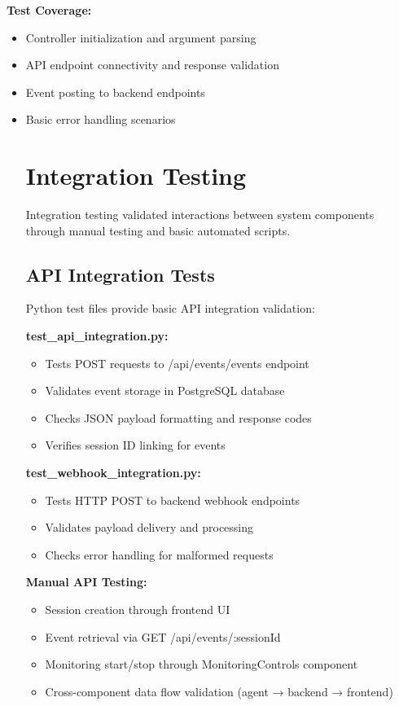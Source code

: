 \textbf{Test Coverage:}
\begin{itemize}
    \item Controller initialization and argument parsing
    \item API endpoint connectivity and response validation
    \item Event posting to backend endpoints
    \item Basic error handling scenarios


\section{Integration Testing}

Integration testing validated interactions between system components through manual testing and basic automated scripts.

\subsection{API Integration Tests}

Python test files provide basic API integration validation:

\textbf{test\_api\_integration.py:}
\begin{itemize}
    \item Tests POST requests to /api/events/events endpoint
    \item Validates event storage in PostgreSQL database
    \item Checks JSON payload formatting and response codes
    \item Verifies session ID linking for events
\end{itemize}

\textbf{test\_webhook\_integration.py:}
\begin{itemize}
    \item Tests HTTP POST to backend webhook endpoints
    \item Validates payload delivery and processing
    \item Checks error handling for malformed requests
\end{itemize}

\textbf{Manual API Testing:}
\begin{itemize}
    \item Session creation through frontend UI
    \item Event retrieval via GET /api/events/:sessionId
    \item Monitoring start/stop through MonitoringControls component
    \item Cross-component data flow validation (agent → backend → frontend)
\end{itemize}


\end{itemize}
